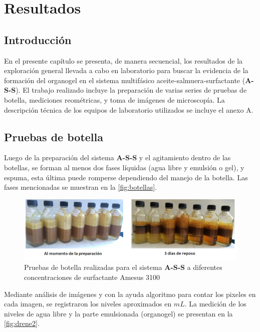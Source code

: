 \chapter{Resultados}
\label{chp:resultados}

\section{Introducción}

En el presente capítulo se presenta, de manera secuencial, los resultados de la exploración general llevada a cabo en laboratorio para buscar la evidencia de la formación del organogel en el sistema multifásico aceite-salmuera-surfactante (\textbf{A-S-S}). El trabajo realizado incluye la preparación de varias series de pruebas de botella, mediciones reométricas, y toma de imágenes de microscopía. La descripción técnica de los equipos de laboratorio utilizados se incluye el anexo A.

\section{Pruebas de botella}

Luego de la preparación del sistema \textbf{A-S-S} y el agitamiento dentro de las botellas, se forman al menos dos fases líquidas (agua libre y  emulsión o gel), y espuma, esta última puede romperse dependiendo del manejo de la botella. Las fases mencionadas se muestran en la \autoref{fig:botellas}.

\begin{figure}\centering
    \includegraphics[width=1.0\textwidth]{Experimental/Botellas_2.png}
    \caption[Fases formadas en botellas]{Pruebas de botella realizadas para el sistema \textbf{A-S-S} a diferentes concentraciones de surfactante Amesus 3100}
    \label{fig:botellas}
\end{figure}

Mediante análisis de imágenes y con la ayuda algoritmo para contar los pixeles en cada imagen, se registraron los niveles aproximados en $mL$. La medición de los niveles de agua libre y la parte emulsionada (organogel) se presentan en la \autoref{fig:drene2}. 

